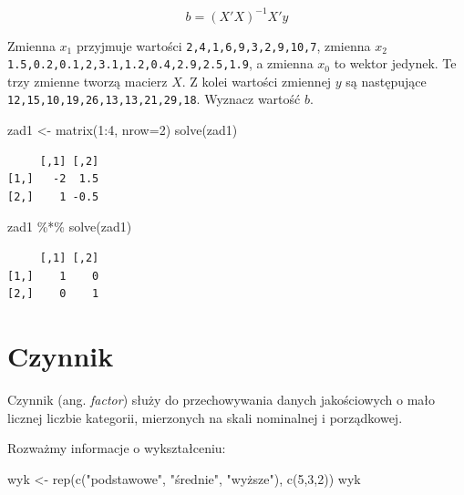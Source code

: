 \documentclass[
  letterpaper,
  DIV=11,
  numbers=noendperiod]{scrreprt}
\newenvironment{Shaded}{\begin{snugshade}}{\end{snugshade}}
\newcommand{\AttributeTok}[1]{\textcolor[rgb]{0.40,0.45,0.13}{#1}}
\newcommand{\DecValTok}[1]{\textcolor[rgb]{0.68,0.00,0.00}{#1}}
\newcommand{\FunctionTok}[1]{\textcolor[rgb]{0.28,0.35,0.67}{#1}}
\newcommand{\NormalTok}[1]{\textcolor[rgb]{0.00,0.23,0.31}{#1}}
\newcommand{\OtherTok}[1]{\textcolor[rgb]{0.00,0.23,0.31}{#1}}
\newcommand{\SpecialCharTok}[1]{\textcolor[rgb]{0.37,0.37,0.37}{#1}}
\newcommand{\StringTok}[1]{\textcolor[rgb]{0.13,0.47,0.30}{#1}}
\begin{document}
\[b=(X'X)^{-1}X'y\]

Zmienna \(x_1\) przyjmuje wartości \texttt{2,4,1,6,9,3,2,9,10,7},
zmienna \(x_2\) \texttt{1.5,0.2,0.1,2,3.1,1.2,0.4,2.9,2.5,1.9}, a
zmienna \(x_0\) to wektor jedynek. Te trzy zmienne tworzą macierz \(X\).
Z kolei wartości zmiennej \(y\) są następujące
\texttt{12,15,10,19,26,13,13,21,29,18}. Wyznacz wartość \(b\).

\begin{Shaded}
\begin{Highlighting}[]
\NormalTok{zad1 }\OtherTok{\textless{}{-}} \FunctionTok{matrix}\NormalTok{(}\DecValTok{1}\SpecialCharTok{:}\DecValTok{4}\NormalTok{, }\AttributeTok{nrow=}\DecValTok{2}\NormalTok{)}
\FunctionTok{solve}\NormalTok{(zad1)}
\end{Highlighting}
\end{Shaded}

\begin{verbatim}
     [,1] [,2]
[1,]   -2  1.5
[2,]    1 -0.5
\end{verbatim}

\begin{Shaded}
\begin{Highlighting}[]
\NormalTok{zad1 }\SpecialCharTok{\%*\%} \FunctionTok{solve}\NormalTok{(zad1)}
\end{Highlighting}
\end{Shaded}

\begin{verbatim}
     [,1] [,2]
[1,]    1    0
[2,]    0    1
\end{verbatim}

\hypertarget{czynnik}{%
\section{Czynnik}\label{czynnik}}

Czynnik (ang. \emph{factor}) służy do przechowywania danych jakościowych
o mało licznej liczbie kategorii, mierzonych na skali nominalnej i
porządkowej.

Rozważmy informacje o wykształceniu:

\begin{Shaded}
\begin{Highlighting}[]
\NormalTok{wyk }\OtherTok{\textless{}{-}} \FunctionTok{rep}\NormalTok{(}\FunctionTok{c}\NormalTok{(}\StringTok{"podstawowe"}\NormalTok{, }\StringTok{"średnie"}\NormalTok{, }\StringTok{"wyższe"}\NormalTok{), }\FunctionTok{c}\NormalTok{(}\DecValTok{5}\NormalTok{,}\DecValTok{3}\NormalTok{,}\DecValTok{2}\NormalTok{))}
\NormalTok{wyk}
\end{Highlighting}
\end{Shaded}
\end{document}
